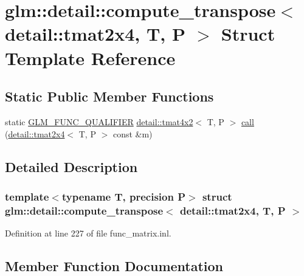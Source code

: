 \hypertarget{structglm_1_1detail_1_1compute__transpose_3_01detail_1_1tmat2x4_00_01_t_00_01_p_01_4}{}\section{glm\+:\+:detail\+:\+:compute\+\_\+transpose$<$ detail\+:\+:tmat2x4, T, P $>$ Struct Template Reference}
\label{structglm_1_1detail_1_1compute__transpose_3_01detail_1_1tmat2x4_00_01_t_00_01_p_01_4}
\subsection*{Static Public Member Functions}
\begin{DoxyCompactItemize}
\item 
static \hyperlink{setup_8hpp_a33fdea6f91c5f834105f7415e2a64407}{G\+L\+M\+\_\+\+F\+U\+N\+C\+\_\+\+Q\+U\+A\+L\+I\+F\+I\+ER} \hyperlink{structglm_1_1detail_1_1tmat4x2}{detail\+::tmat4x2}$<$ T, P $>$ \hyperlink{structglm_1_1detail_1_1compute__transpose_3_01detail_1_1tmat2x4_00_01_t_00_01_p_01_4_a773fe20856af1171dcc8d60246eea5d2}{call} (\hyperlink{structglm_1_1detail_1_1tmat2x4}{detail\+::tmat2x4}$<$ T, P $>$ const \&m)
\end{DoxyCompactItemize}


\subsection{Detailed Description}
\subsubsection*{template$<$typename T, precision P$>$\newline
struct glm\+::detail\+::compute\+\_\+transpose$<$ detail\+::tmat2x4, T, P $>$}



Definition at line 227 of file func\+\_\+matrix.\+inl.



\subsection{Member Function Documentation}
\mbox{\label{structglm_1_1detail_1_1compute__transpose_3_01detail_1_1tmat2x4_00_01_t_00_01_p_01_4_a773fe20856af1171dcc8d60246eea5d2}} 
